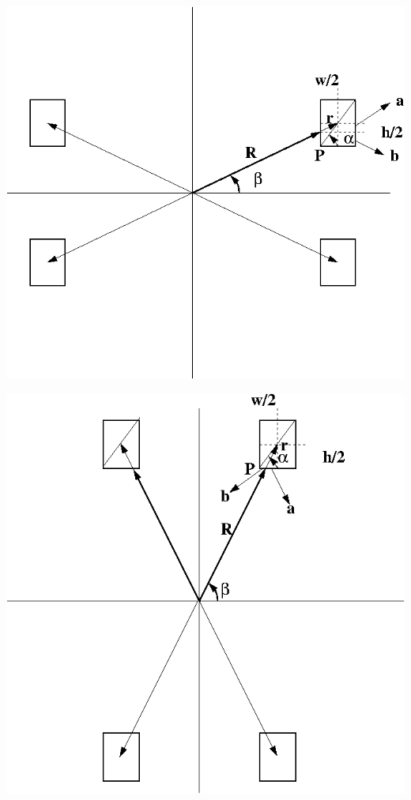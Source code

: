 \documentclass{article}
\begin{document}
\vspace*{-3cm}
\includegraphics[width=\linewidth]{rotat_letters.png}

\newpage
\vspace*{-3cm}
\includegraphics[width=\linewidth]{rotat_letters_2.png}
\end{document}
